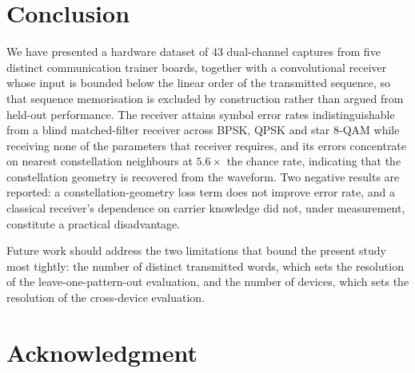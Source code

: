 \documentclass[journal]{IEEEtran}   %
\newif\ifdraft
\newcommand{\todonote}[2]{%
  \ifdraft
    \par\medskip\noindent
    \fbox{\parbox{0.94\columnwidth}{\footnotesize
      \textbf{[TO WRITE --- #1]}\\[2pt]#2}}%
    \par\medskip
  \fi}
\begin{document}
\section{Conclusion}
We have presented a hardware dataset of 43 dual-channel captures from five
distinct communication trainer boards, together with a convolutional receiver
whose input is bounded below the linear order of the transmitted sequence, so
that sequence memorisation is excluded by construction rather than argued from
held-out performance. The receiver attains symbol error rates indistinguishable
from a blind matched-filter receiver across BPSK, QPSK and star 8-QAM while
receiving none of the parameters that receiver requires, and its errors
concentrate on nearest constellation neighbours at $5.6\times$ the chance rate,
indicating that the constellation geometry is recovered from the waveform. Two
negative results are reported: a constellation-geometry loss term does not
improve error rate, and a classical receiver's dependence on carrier knowledge
did not, under measurement, constitute a practical disadvantage.

Future work should address the two limitations that bound the present study
most tightly: the number of distinct transmitted words, which sets the
resolution of the leave-one-pattern-out evaluation, and the number of devices,
which sets the resolution of the cross-device evaluation.

\section*{Acknowledgment}
\todonote{acknowledgment}{%
Laboratory access, the technical assistance received during the capture
campaign, and any funding source. The lab assistant who supported the bench
sessions should be named here if not an author.}

\todonote{references --- VERIFY BEFORE SUBMISSION}{%
Every entry in \texttt{refs.bib} was written from working knowledge, not copied
from a database. Author lists, titles, venues and years are believed correct;
\textbf{volumes and page numbers must be checked} against IEEE Xplore, and DOIs
added. Delete this note once verified.}




\todonote{author biographies}{%
IEEE Access requires a short biography and a photograph for each author, placed
here after the references. Use the \texttt{IEEEbiography} environment from the
class documentation; the photograph is passed as the optional argument as a
$1\,\text{in}\times1.25\,\text{in}$ \texttt{includegraphics} with
\texttt{keepaspectratio}.}
\end{document}
